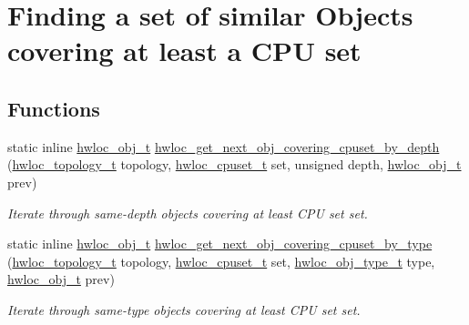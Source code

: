 \hypertarget{group__hwlocality__helper__find__coverings}{
\section{Finding a set of similar Objects covering at least a CPU set}
\label{group__hwlocality__helper__find__coverings}
}
\subsection*{Functions}
\begin{DoxyCompactItemize}
\item 
static inline \hyperlink{structhwloc__obj}{hwloc\_\-obj\_\-t} \hyperlink{group__hwlocality__helper__find__coverings_ga39cbd3f1608d0fe503d396430cffe219}{hwloc\_\-get\_\-next\_\-obj\_\-covering\_\-cpuset\_\-by\_\-depth} (\hyperlink{group__hwlocality__topology_ga9d1e76ee15a7dee158b786c30b6a6e38}{hwloc\_\-topology\_\-t} topology, \hyperlink{group__hwlocality__cpuset_ga7366332f7090f5b54d4b25a0c2c4b411}{hwloc\_\-cpuset\_\-t} set, unsigned depth, \hyperlink{structhwloc__obj}{hwloc\_\-obj\_\-t} prev)
\begin{DoxyCompactList}\small\item\em Iterate through same-\/depth objects covering at least CPU set {\ttfamily set}. \item\end{DoxyCompactList}\item 
static inline \hyperlink{structhwloc__obj}{hwloc\_\-obj\_\-t} \hyperlink{group__hwlocality__helper__find__coverings_gaad89905a7c9388283535296802d766cb}{hwloc\_\-get\_\-next\_\-obj\_\-covering\_\-cpuset\_\-by\_\-type} (\hyperlink{group__hwlocality__topology_ga9d1e76ee15a7dee158b786c30b6a6e38}{hwloc\_\-topology\_\-t} topology, \hyperlink{group__hwlocality__cpuset_ga7366332f7090f5b54d4b25a0c2c4b411}{hwloc\_\-cpuset\_\-t} set, \hyperlink{group__hwlocality__types_gacd37bb612667dc437d66bfb175a8dc55}{hwloc\_\-obj\_\-type\_\-t} type, \hyperlink{structhwloc__obj}{hwloc\_\-obj\_\-t} prev)
\begin{DoxyCompactList}\small\item\em Iterate through same-\/type objects covering at least CPU set {\ttfamily set}. \item\end{DoxyCompactList}\end{DoxyCompactItemize}


